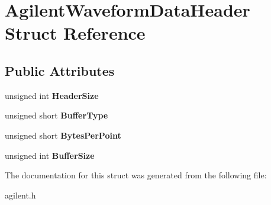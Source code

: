 \hypertarget{structAgilentWaveformDataHeader}{
\section{AgilentWaveformDataHeader Struct Reference}
\label{structAgilentWaveformDataHeader}
}
\subsection*{Public Attributes}
\begin{DoxyCompactItemize}
\item 
\hypertarget{structAgilentWaveformDataHeader_a856048ba240af9931f27c58a9724fb5c}{
unsigned int {\bfseries HeaderSize}}
\label{structAgilentWaveformDataHeader_a856048ba240af9931f27c58a9724fb5c}

\item 
\hypertarget{structAgilentWaveformDataHeader_a8e1376821494cb9906f619259ed691cc}{
unsigned short {\bfseries BufferType}}
\label{structAgilentWaveformDataHeader_a8e1376821494cb9906f619259ed691cc}

\item 
\hypertarget{structAgilentWaveformDataHeader_ade0ed6ded4ca1069bfcefcf0af030493}{
unsigned short {\bfseries BytesPerPoint}}
\label{structAgilentWaveformDataHeader_ade0ed6ded4ca1069bfcefcf0af030493}

\item 
\hypertarget{structAgilentWaveformDataHeader_a0345c7ba26246cea3df89db96f05eea2}{
unsigned int {\bfseries BufferSize}}
\label{structAgilentWaveformDataHeader_a0345c7ba26246cea3df89db96f05eea2}

\end{DoxyCompactItemize}


The documentation for this struct was generated from the following file:\begin{DoxyCompactItemize}
\item 
agilent.h\end{DoxyCompactItemize}

